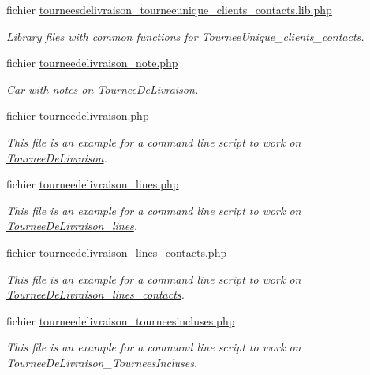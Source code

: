 \begin{DoxyCompactItemize}
fichier \hyperlink{tourneesdelivraison__tourneeunique__clients__contacts_8lib_8php}{tourneesdelivraison\+\_\+tourneeunique\+\_\+clients\+\_\+contacts.\+lib.\+php}
\begin{DoxyCompactList}\small\item\em Library files with common functions for Tournee\+Unique\+\_\+clients\+\_\+contacts. \end{DoxyCompactList}\item 
fichier \hyperlink{tourneedelivraison__note_8php}{tourneedelivraison\+\_\+note.\+php}
\begin{DoxyCompactList}\small\item\em Car with notes on \hyperlink{classTourneeDeLivraison}{Tournee\+De\+Livraison}. \end{DoxyCompactList}\item 
fichier \hyperlink{scripts_2tourneedelivraison_8php}{tourneedelivraison.\+php}
\begin{DoxyCompactList}\small\item\em This file is an example for a command line script to work on \hyperlink{classTourneeDeLivraison}{Tournee\+De\+Livraison}. \end{DoxyCompactList}\item 
fichier \hyperlink{tourneedelivraison__lines_8php}{tourneedelivraison\+\_\+lines.\+php}
\begin{DoxyCompactList}\small\item\em This file is an example for a command line script to work on \hyperlink{classTourneeDeLivraison__lines}{Tournee\+De\+Livraison\+\_\+lines}. \end{DoxyCompactList}\item 
fichier \hyperlink{tourneedelivraison__lines__contacts_8php}{tourneedelivraison\+\_\+lines\+\_\+contacts.\+php}
\begin{DoxyCompactList}\small\item\em This file is an example for a command line script to work on \hyperlink{classTourneeDeLivraison__lines__contacts}{Tournee\+De\+Livraison\+\_\+lines\+\_\+contacts}. \end{DoxyCompactList}\item 
fichier \hyperlink{tourneedelivraison__tourneesincluses_8php}{tourneedelivraison\+\_\+tourneesincluses.\+php}
\begin{DoxyCompactList}\small\item\em This file is an example for a command line script to work on Tournee\+De\+Livraison\+\_\+\+Tournees\+Incluses. \end{DoxyCompactList}\item 

\end{DoxyCompactItemize}
